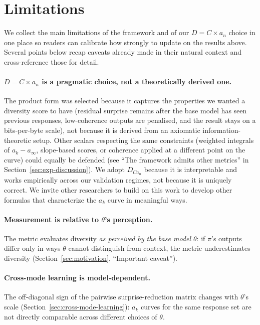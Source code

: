 \section{Limitations}\label{sec:limitations}

We collect the main limitations of the framework and of our $D = C \times a_n$ choice in one place so readers can calibrate how strongly to update on the results above.
Several points below recap caveats already made in their natural context and cross-reference those for detail.

\paragraph{$D = C \times a_n$ is a pragmatic choice, not a theoretically derived one.}
The product form was selected because it captures the properties we wanted a diversity score to have (residual surprise remains after the base model has seen previous responses, low-coherence outputs are penalised, and the result stays on a bits-per-byte scale), not because it is derived from an axiomatic information-theoretic setup.
Other scalars respecting the same constraints (weighted integrals of $a_k - a_\infty$, slope-based scores, or coherence applied at a different point on the curve) could equally be defended (see ``The framework admits other metrics'' in Section~\ref{sec:exp-discussion}).
We adopt $D_{Ca_n}$ because it is interpretable and works empirically across our validation regimes, not because it is uniquely correct.
We invite other researchers to build on this work to develop other formulas that characterize the $a_k$ curve in meaningful ways.

\paragraph{Measurement is relative to $\theta$'s perception.}
The metric evaluates diversity \emph{as perceived by the base model $\theta$}: if $\pi$'s outputs differ only in ways $\theta$ cannot distinguish from context, the metric underestimates diversity (Section~\ref{sec:motivation}, ``Important caveat'').

\paragraph{Cross-mode learning is model-dependent.}
The off-diagonal sign of the pairwise surprise-reduction matrix changes with $\theta$'s scale (Section~\ref{sec:cross-mode-learning}): $a_k$ curves for the same response set are not directly comparable across different choices of $\theta$.

